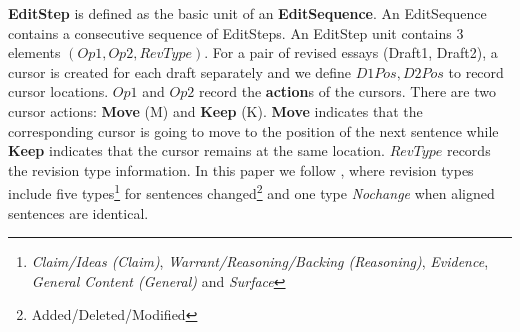 \documentclass[11pt]{article}
\begin{document}
\textbf{EditStep} is defined as the basic unit of an \textbf{EditSequence}. An EditSequence contains a consecutive sequence of EditSteps. An EditStep unit contains 3 elements $(Op1, Op2, RevType)$. For a pair of revised essays (Draft1, Draft2), a cursor is created for each draft separately and we define $D1Pos, D2Pos$ to record cursor locations. $Op1$ and $Op2$ record the \textbf{action}s of the cursors. There are two cursor actions: \textbf{Move} (M) and \textbf{Keep} (K). \textbf{Move} indicates that the corresponding cursor is going to move to the position of the next sentence while \textbf{Keep} indicates that the cursor remains at the same location. $RevType$ records the revision type information. In this paper we follow \cite{zhang-litman:2016:N16-1}, where revision types include five types\footnote{\textit{Claim/Ideas (Claim)}, \textit{Warrant/Reasoning/Backing (Reasoning)}, \textit{Evidence}, \textit{General Content (General)} and \textit{Surface}} for sentences changed\footnote{Added/Deleted/Modified} and one type \textit{Nochange} when aligned sentences are identical. 
\begin{figure*}[tp]
\centering
{}
\caption{Example of EditSequence transformation. The first row represents the sentences of the original essay (Draft1) and the second row represents the sentences of the revised essay (Draft2). The vertical direction indicates sentence alignment. The shadowed sentences are revised and there are three revisions: (Null, 2, Add,  Reasoning), (2, Null, Delete,  Reasoning) and (3, 3, Modify, Surface).  With the cursors, we transform the revisions to 4 consecutive EditSteps from left to right and generate the sequence representation (M-M-Nochange -$>$ K-M-Reasoning -$>$ M-K-Reasoning -$>$ M-M-Surface). } 
\label{fig:editsequence}
\end{figure*}
\end{document}
